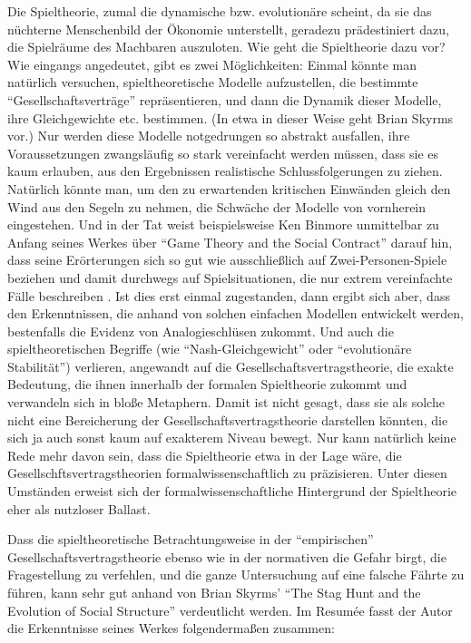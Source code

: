 \documentclass[12pt,a4paper,ngerman]{article}
\begin{document}
Die Spieltheorie, zumal die dynamische bzw. evolutionäre scheint, da
sie das nüchterne Menschenbild der Ökonomie unterstellt, geradezu
prädestiniert dazu, die Spielräume des Machbaren auszuloten. Wie geht
die Spieltheorie dazu vor? Wie eingangs angedeutet, gibt es zwei
Möglichkeiten: Einmal könnte man natürlich versuchen,
spieltheoretische Modelle aufzustellen, die bestimmte
"`Gesellschaftsverträge"' repräsentieren, und dann die Dynamik dieser
Modelle, ihre Gleichgewichte etc. bestimmen. (In etwa in dieser Weise
geht Brian Skyrms vor.) Nur werden diese Modelle notgedrungen so
abstrakt ausfallen, ihre Voraussetzungen zwangsläufig so stark
vereinfacht werden müssen, dass sie es kaum erlauben, aus den
Ergebnissen realistische Schlussfolgerungen zu ziehen. Natürlich
könnte man, um den zu erwartenden kritischen Einwänden gleich den Wind
aus den Segeln zu nehmen, die Schwäche der Modelle von vornherein
eingestehen. Und in der Tat weist beispielsweise Ken Binmore
unmittelbar zu Anfang seines Werkes über "`Game Theory and the Social
Contract"' darauf hin, dass seine Erörterungen sich so gut wie
ausschließlich auf Zwei-Personen-Spiele beziehen und damit durchwegs
auf Spielsituationen, die nur extrem vereinfachte Fälle beschreiben
\cite[S. vii]{binmore:1994}. Ist dies erst einmal zugestanden, dann ergibt
sich aber, dass den Erkenntnissen, die anhand von solchen einfachen
Modellen entwickelt werden, bestenfalls die Evidenz von
Analogieschlüsen zukommt. Und auch die spieltheoretischen Begriffe
(wie "`Nash-Gleichgewicht"' oder "`evolutionäre Stabilität"')
verlieren, angewandt auf die Gesellschaftsvertragstheorie, die exakte
Bedeutung, die ihnen innerhalb der formalen Spieltheorie zukommt und
verwandeln sich in bloße Metaphern. Damit ist nicht gesagt, dass sie
als solche nicht eine Bereicherung der Gesellschaftsvertragstheorie
darstellen könnten, die sich ja auch sonst kaum auf exakterem Niveau
bewegt. Nur kann natürlich keine Rede mehr davon sein, dass die
Spieltheorie etwa in der Lage wäre, die Gesellschftsvertragstheorien
formalwissenschaftlich zu präzisieren. Unter diesen Umständen erweist
sich der formalwissenschaftliche Hintergrund der Spieltheorie eher als
nutzloser Ballast.

Dass die spieltheoretische Betrachtungsweise in der "`empirischen"'
Gesellschaftsvertragstheorie ebenso wie in der normativen die Gefahr
birgt, die Fragestellung zu verfehlen, und die ganze Untersuchung auf
eine falsche Fährte zu führen, kann sehr gut anhand von Brian Skyrms'
"`The Stag Hunt and the Evolution of Social
Structure"' \cite{skyrms:2004} verdeutlicht werden. Im Resumée fasst
der Autor die Erkenntnisse seines Werkes folgendermaßen zusammen:
\end{document}
